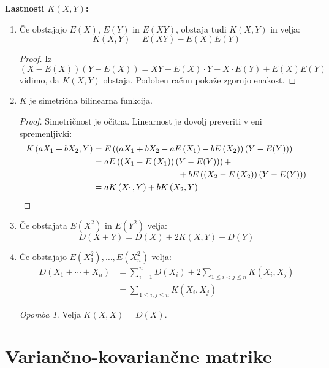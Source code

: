\documentclass[12pt]{book}
\def\n{\noindent}
\theoremstyle{definition}
\theoremstyle{plain}
\theoremstyle{plain}
\theoremstyle{plain}
\theoremstyle{plain}
\theoremstyle{remark}
\newtheorem*{opomba}{Opomba}
\begin{document}
\n \textbf{Lastnosti $K(X,Y)$:}

\begin{enumerate}
    \item Če obstajajo $E(X)$, $E(Y)$ in $E(XY)$, obstaja tudi $K(X,Y)$ in velja: 
    $$
    K(X, Y)=E(X Y)-E(X) E(Y)
    $$
    \begin{proof}
        Iz $(X-E(X))(Y-E(X))=X Y-E(X) \cdot Y-X \cdot E(Y)+E(X) E(Y)$ vidimo, da $K(X,Y)$ obstaja. Podoben račun pokaže zgornjo enakost. 
    \end{proof}
    \item $K$ je simetrična bilinearna funkcija.
    \begin{proof}
        Simetričnost je očitna. Linearnost je dovolj preveriti v eni spremenljivki: 
        $$
        \begin{aligned}
            K\left(a X_1+b X_2, Y\right)&=E\left(\left(a X_1+b X_2-a E\left(X_1\right)-b E\left(X_2\right)\right)(Y-E(Y))\right) \\
            &=a E\left(\left(X_1-E\left(X_1\right)\right)(Y-E(Y))\right)+ \\
            & \hspace{3.5cm} +b E\left(\left(X_2-E\left(X_2\right)\right)(Y-E(Y))\right) \\
            &=a K\left(X_1, Y\right)+b K\left(X_2, Y\right)
        \end{aligned}
        $$
    \end{proof}
    \item Če obstajata $E\left(X^2\right)$ in $E\left(Y^2\right)$ velja: 
    $$
    D(X+Y)=D(X)+2 K(X, Y)+D(Y)
    $$
    \item Če obstajajo $E\left(X_1^2\right), \ldots, E\left(X_n^2\right)$ velja: 
    $$
    \begin{aligned}
        D\left(X_1+\cdots+X_n\right)&=\sum_{i=1}^n D\left(X_i\right)+2 \sum_{1 \leq i<j \leq n} K\left(X_i, X_j\right) \\
        &=\sum_{1 \leq i, j \leq n} K\left(X_i, X_j\right)
    \end{aligned}
    $$
    \begin{opomba}
        Velja $K(X, X)=D(X)$.
    \end{opomba}
\end{enumerate}

\section{Variančno-kovariančne matrike}
\end{document}
